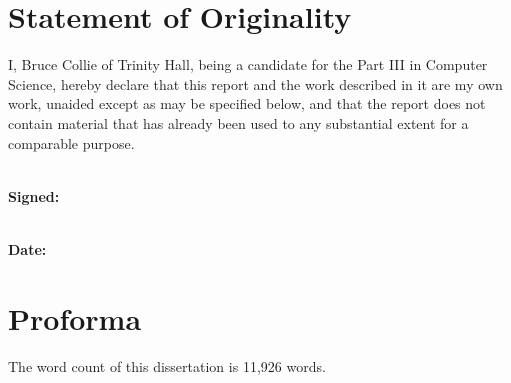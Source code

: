 \section*{Statement of Originality}

I, Bruce Collie of Trinity Hall, being a candidate for the Part III in Computer
Science, hereby declare that this report and the work described in it are my own
work, unaided except as may be specified below, and that the report does not
contain material that has already been used to any substantial extent for a
comparable purpose.

\vspace{0.5cm}

\noindent
\\\textbf{Signed:}

\vspace{0.5cm}

\noindent
\\\textbf{Date:}

\section*{Proforma}

The word count of this dissertation is 11,926 words.
